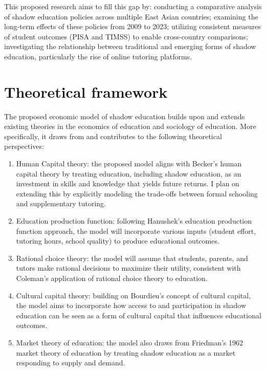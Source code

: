 \documentclass[12pt,a4paper,onecolumn]{article}
\numberwithin{equation}{section}
\begin{document}
This proposed research aims to fill this gap by: conducting a comparative analysis of shadow education policies across multiple East Asian countries; examining the long-term effects of these policies from 2009 to 2023; utilizing consistent measures of student outcomes (PISA and TIMSS) to enable cross-country comparisons; investigating the relationship between traditional and emerging forms of shadow education, particularly the rise of online tutoring platforms.
\section{Theoretical framework}

The proposed economic model of shadow education builds upon and extends existing theories in the economics of education and sociology of education. More specifically, it draws from and contributes to the following theoretical perspectives:

\begin{enumerate}
    \item Human Capital theory: the proposed model aligns with Becker's \parencite{becker1964human} human capital theory by treating education, including shadow education, as an investment in skills and knowledge that yields future returns. I plan on extending this by explicitly modeling the trade-offs between formal schooling and supplementary tutoring.
    
    \item Education production function: following Hanushek's \parencite{hanushek1987educational} education production function approach, the model will incorporate various inputs (student effort, tutoring hours, school quality) to produce educational outcomes. 
    
    \item Rational choice theory: the model will assume that students, parents, and tutors make rational decisions to maximize their utility, consistent with Coleman's \parencite{coleman1990commentary} application of rational choice theory to education. 
    
    \item Cultural capital theory: building on Bourdieu's \parencite{bourdieu2011forms} concept of cultural capital, the model aims to incorporate how access to and participation in shadow education can be seen as a form of cultural capital that influences educational outcomes. 
    
    \item Market theory of education: the model also draws from Friedman's 1962 \parencite{friedman2016capitalism} market theory of education by treating shadow education as a market responding to supply and demand. 
\end{enumerate}
\end{document}
